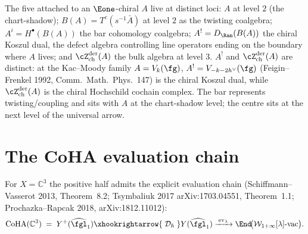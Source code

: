 \begin{remark}
\label{rem:bulk-five-objects}
The five attached to an $\Eone$-chiral $A$ live at distinct loci:
$A$ at level $2$ (the chart-shadow); $B(A) = T^{c}(s^{-1}\bar A)$ at
level $2$ as the twisting coalgebra; $A^{i} = H^{\bullet}(B(A))$ the bar
cohomology coalgebra; $A^{!} = D_{\Ran}(B(A))$ the chiral Koszul dual,
the defect algebra controlling line operators ending on the boundary
where $A$ lives; and
$\cZ^{\mathrm{der}}_{\mathrm{ch}}(A)$ the bulk algebra at level $3$.
$A^{!}$ and $\cZ^{\mathrm{der}}_{\mathrm{ch}}(A)$ are distinct: at
the Kac--Moody family $A = V_{k}(\fg)$,
$A^{!} = V_{-k - 2 h^{\vee}}(\fg)$ (Feigin--Frenkel 1992, Comm.\ Math.\
Phys.\ 147) is the chiral Koszul dual, while
$\cZ^{\mathrm{der}}_{\mathrm{ch}}(A)$ is the chiral Hochschild cochain
complex. The bar represents twisting/coupling and
sits with $A$ at the chart-shadow level; the centre sits at the next
level of the universal arrow.
\end{remark}

\section{The CoHA evaluation chain}
\label{sec:bulk-coha-evaluation-chain}

For $X = \mathbb C^3$ the positive half admits the explicit evaluation
chain (Schiffmann--Vasserot 2013, Theorem~8.2; Tsymbaliuk 2017
arXiv:1703.04551, Theorem~1.1; Prochazka--Rapcak 2018,
arXiv:1812.11012):
\begin{equation}
 \label{eq:coha-evaluation-chain}
 \mathrm{CoHA}(\mathbb C^3)
 \;=\; Y^{+}(\widehat{\fgl}_1)
 \xhookrightarrow{\;\mathcal D_{\hbar}\;}
 Y(\widehat{\fgl}_1)
 \xrightarrow{\;\mathrm{ev}_{\lambda}\;}
 \End\!\bigl(\mathcal W_{1+\infty}[\lambda]\text{-vac}\bigr).
\end{equation}

